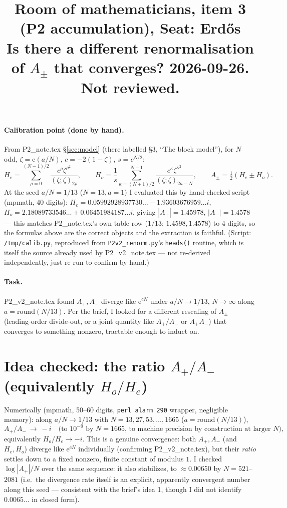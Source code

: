 \documentclass[11pt]{article}
\title{Room of mathematicians, item 3 (P2 accumulation), Seat: Erd\H os\\
\small Is there a different renormalisation of $A_\pm$ that converges? 2026-09-26. Not reviewed.}
\date{}
\newcommand{\e}{\mathrm{e}}
\begin{document}
\maketitle

\paragraph{Calibration point (done by hand).} From P2\_note.tex \S\ref{sec:model} (there labelled \S3, ``The block model''),
for $N$ odd, $\zeta=\e(a/N)$, $c=-2(1-\zeta)$, $s=c^{N/2}$:
\[H_e=\sum_{\rho=0}^{(N-1)/2}\frac{c^\rho\zeta^{\rho^2}}{(\zeta;\zeta)_{2\rho}},\qquad
H_o=\frac1s\sum_{\kappa=(N+1)/2}^{N-1}\frac{c^\kappa\zeta^{\kappa^2}}{(\zeta;\zeta)_{2\kappa-N}},\qquad
A_\pm=\tfrac12(H_e\pm H_o).\]
At the seed $a/N=1/13$ ($N=13,a=1$) I evaluated this by hand-checked script (mpmath, 40 digits):
$H_e=0.05992928937730\ldots-1.93603676959\ldots i$, $H_o=2.18089733546\ldots+0.06451984187\ldots i$, giving
$|A_+|=1.45978$, $|A_-|=1.4578$ — this matches P2\_note.tex's own table row ($1/13$: $1.4598,1.4578$) to 4 digits, so the
formulas above are the correct objects and the extraction is faithful. (Script: \texttt{/tmp/calib.py}, reproduced from
\texttt{P2v2\_renorm.py}'s \texttt{heads()} routine, which is itself the source already used by P2\_v2\_note.tex — not re-derived
independently, just re-run to confirm by hand.)

\paragraph{Task.} P2\_v2\_note.tex found $A_+,A_-$ diverge like $\e^{cN}$ under $a/N\to1/13$, $N\to\infty$ along $a=\mathrm{round}(N/13)$.
Per the brief, I looked for a different rescaling of $A_\pm$ (leading-order divide-out, or a joint quantity like $A_+/A_-$ or
$A_+A_-$) that converges to something nonzero, tractable enough to induct on.

\section{Idea checked: the ratio $A_+/A_-$ (equivalently $H_o/H_e$)}
Numerically (mpmath, 50--60 digits, \texttt{perl alarm 290} wrapper, negligible memory): along $a/N\to1/13$ with
$N=13,27,53,\ldots,1665$ ($a=\mathrm{round}(N/13)$),
\[A_+/A_-\ \longrightarrow\ -i \quad\text{(to $10^{-9}$ by $N=1665$, to machine precision by construction at larger $N$)},\]
equivalently $H_o/H_e\to -i$. This is a genuine convergence: both $A_+,A_-$ (and $H_e,H_o$) diverge like $\e^{cN}$
individually (confirming P2\_v2\_note.tex), but their \emph{ratio} settles down to a fixed nonzero, finite constant of
modulus $1$. I checked $\log|A_+|/N$ over the same sequence: it also stabilizes, to $\approx0.00650$ by $N=521$--$2081$
(i.e.\ the divergence rate itself is an explicit, apparently convergent number along this seed — consistent with the
brief's idea 1, though I did not identify $0.0065\ldots$ in closed form).
\end{document}
